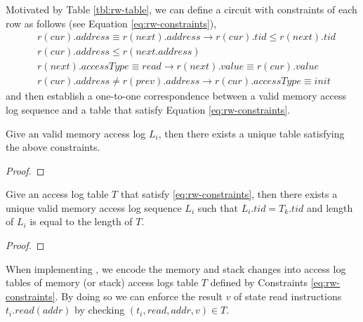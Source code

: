 \noindent Motivated by Table \ref{tbl:rw-table}, we can define a circuit with constraints of each row as follows (see Equation \ref{eq:rw-constraints}),
\begin{equation}
\label{eq:rw-constraints}
\begin{split}
    &r(cur).address \equiv r(next).address \rightarrow r(cur).tid \le r(next).tid \\
    &r(cur).address  \le r(next.address) \\
    &r(next).accessType \equiv read \rightarrow r(next).value \equiv r(cur).value \\
    &r(cur).address \neq r(prev).address \rightarrow r(cur).accessType \equiv init
\end{split}
\end{equation}
and then establish a one-to-one correspondence between a valid memory access log sequence and a table that satisfy Equation \ref{eq:rw-constraints}.
\begin{theorem}
\label{thm:one-one-rw-1}
Give an valid memory access log ${L_i}$, then there exists a unique table satisfying the above constraints.
\end{theorem}
\begin{proof}
\end{proof}
\begin{theorem}
\label{thm:one-one-rw-2}
Give an access log table $T$ that satisfy \ref{eq:rw-constraints}, then there exists a unique valid memory access log sequence $L_i$ such that $L_i.tid = T_k.tid$ and length of $L_i$ is equal to the length of $T$.
\end{theorem}
\begin{proof}
\end{proof}
When implementing \zkwasm, we encode the memory and stack changes into access log tables of memory (or stack) access logs table $T$ defined by Constraints \ref{eq:rw-constraints}. By doing so we can enforce the result $v$ of state read instructions $t_i.read(addr)$ by checking $(t_i, read, addr, v) \in T$.

